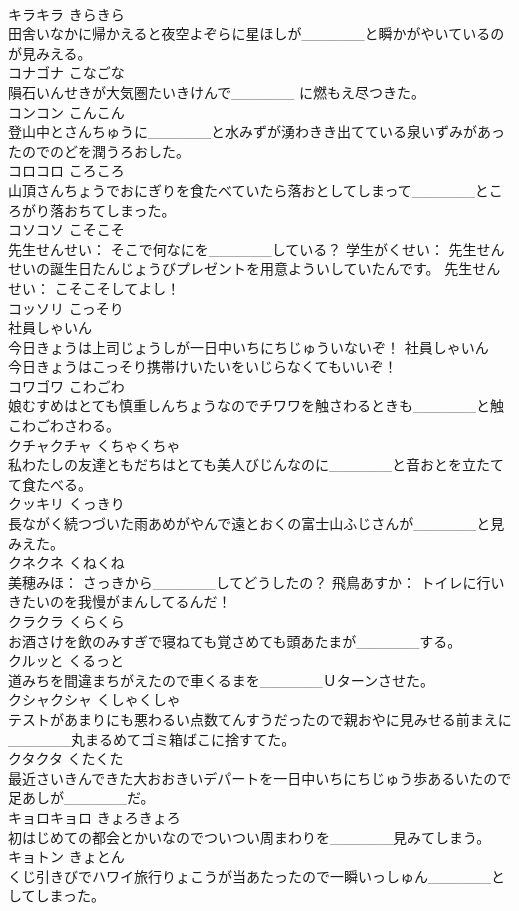 \documentclass[8pt]{extreport}
\begin{document}
\begin{CJK}{UTF8}{min}
\\	キラキラ	きらきら	
\\	田舎いなかに帰かえると夜空よぞらに星ほしが______と瞬かがやいているのが見みえる。	
\\	コナゴナ	こなごな	
\\	隕石いんせきが大気圏たいきけんで______ に燃もえ尽つきた。	
\\	コンコン	こんこん	
\\	登山中とさんちゅうに______と水みずが湧わきき出てている泉いずみがあったのでのどを潤うろおした。	
\\	コロコロ	ころころ	
\\	山頂さんちょうでおにぎりを食たべていたら落おとしてしまって______ところがり落おちてしまった。	
\\	コソコソ	こそこそ	
\\	先生せんせい： そこで何なにを______している？ 学生がくせい： 先生せんせいの誕生日たんじょうびプレゼントを用意よういしていたんです。 先生せんせい： こそこそしてよし！	
\\	コッソリ	こっそり	
\\	社員しゃいん
\\	今日きょうは上司じょうしが一日中いちにちじゅういないぞ！ 社員しゃいん
\\	今日きょうはこっそり携帯けいたいをいじらなくてもいいぞ！	
\\	コワゴワ	こわごわ	
\\	娘むすめはとても慎重しんちょうなのでチワワを触さわるときも______と触こわごわさわる。	
\\	クチャクチャ	くちゃくちゃ	
\\	私わたしの友達ともだちはとても美人びじんなのに______と音おとを立たてて食たべる。	
\\	クッキリ	くっきり	
\\	長ながく続つづいた雨あめがやんで遠とおくの富士山ふじさんが______と見みえた。	
\\	クネクネ	くねくね	
\\	美穂みほ： さっきから______してどうしたの？ 飛鳥あすか： トイレに行いきたいのを我慢がまんしてるんだ！	
\\	クラクラ	くらくら	
\\	お酒さけを飲のみすぎで寝ねても覚さめても頭あたまが______する。	
\\	クルッと	くるっと	
\\	道みちを間違まちがえたので車くるまを______Ｕターンさせた。	
\\	クシャクシャ	くしゃくしゃ	
\\	テストがあまりにも悪わるい点数てんすうだったので親おやに見みせる前まえに______丸まるめてゴミ箱ばこに捨すてた。	
\\	クタクタ	くたくた	
\\	最近さいきんできた大おおきいデパートを一日中いちにちじゅう歩あるいたので足あしが______だ。	
\\	キョロキョロ	きょろきょろ	
\\	初はじめての都会とかいなのでついつい周まわりを______見みてしまう。	
\\	キョトン	きょとん	
\\	くじ引きびでハワイ旅行りょこうが当あたったので一瞬いっしゅん______としてしまった。	
\end{CJK}
\end{document}
